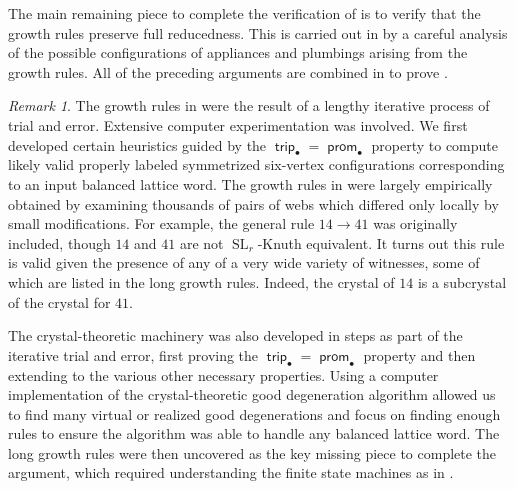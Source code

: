 \documentclass{amsart}
\theoremstyle{definition}
\theoremstyle{remark}
\newtheorem{remark}[theorem]{Remark}
\numberwithin{equation}{section}
\DeclareMathOperator{\trip}{\mathsf{trip}}
\DeclareMathOperator{\prom}{\mathsf{prom}}
\DeclareMathOperator{\SL}{SL}
\begin{document}
The main remaining piece to complete the verification of  is to verify that the growth rules preserve full reducedness. This is carried out in  by a  careful analysis of the possible configurations of appliances and plumbings arising from the growth rules. All of the preceding arguments are combined in  to prove .

\begin{remark}
    The growth rules in  were the result of a lengthy iterative process of trial and error. Extensive computer experimentation was involved. We first developed certain heuristics guided by the $\trip_\bullet = \prom_\bullet$ property to compute likely valid properly labeled symmetrized six-vertex configurations corresponding to an input balanced lattice word. The growth rules in  were largely empirically obtained by examining thousands of pairs of webs which differed only locally by small modifications. For example, the general rule $14 \to 41$ was originally included, though $14$ and $41$ are not $\SL_r$-Knuth equivalent. It turns out this rule is valid given the presence of any of a very wide variety of witnesses, some of which are listed in the long growth rules. Indeed, the crystal of $14$ is a subcrystal of the crystal for $41$.
    
    The crystal-theoretic machinery was also developed in steps as part of the iterative trial and error, first proving the $\trip_\bullet = \prom_\bullet$ property and then extending to the various other necessary properties. Using a computer implementation of the crystal-theoretic good degeneration algorithm allowed us to find many virtual or realized good degenerations and focus on finding enough rules to ensure the algorithm was able to handle any balanced lattice word. The long growth rules were then uncovered as the key missing piece to complete the argument, which required understanding the finite state machines as in .
\end{remark}
\end{document}

